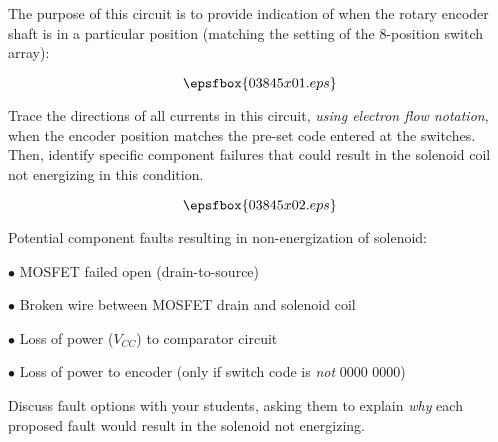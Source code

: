 

The purpose of this circuit is to provide indication of when the rotary encoder shaft is in a particular position (matching the setting of the 8-position switch array):

$$\epsfbox{03845x01.eps}$$

Trace the directions of all currents in this circuit, {\it using electron flow notation}, when the encoder position matches the pre-set code entered at the switches.  Then, identify specific component failures that could result in the solenoid coil not energizing in this condition.







$$\epsfbox{03845x02.eps}$$

Potential component faults resulting in non-energization of solenoid:

\medskip
\item{$\bullet$} MOSFET failed open (drain-to-source)
\item{$\bullet$} Broken wire between MOSFET drain and solenoid coil
\item{$\bullet$} Loss of power ($V_{CC}$) to comparator circuit
\item{$\bullet$} Loss of power to encoder (only if switch code is {\it not} 0000 0000)
\medskip







Discuss fault options with your students, asking them to explain {\it why} each proposed fault would result in the solenoid not energizing.




